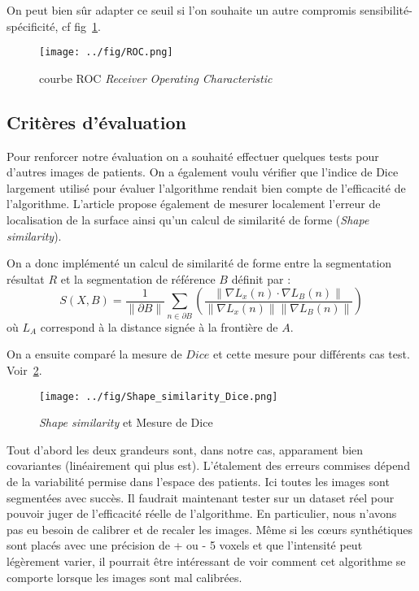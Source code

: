 \documentclass{article}
\begin{document}
On peut bien sûr adapter ce seuil si l'on souhaite un autre compromis sensibilité-spécificité, cf fig~\ref{fig:ROC}.

\begin{figure}[h!]
  \begin{center}
    \caption{courbe ROC \textit{Receiver Operating Characteristic}}
    \texttt{[image: ../fig/ROC.png]}
    \label{fig:ROC}
  \end{center}
\end{figure}

\subsection{Critères d'évaluation}

Pour renforcer notre évaluation on a souhaité effectuer quelques tests pour d'autres images de patients. On a également voulu vérifier que l'indice de Dice largement utilisé pour évaluer l'algorithme rendait bien compte de l'efficacité de l'algorithme. L'article propose également de mesurer localement l'erreur de localisation de la surface ainsi qu'un calcul de similarité de forme (\textit{Shape similarity}). 


On a donc implémenté un calcul de similarité de forme entre la segmentation résultat $R$ et la segmentation de référence $B$ définit par :
$$ S(X,B)= \frac{1}{\|\partial B \|} \sum_{n \in \partial B}{ \left( \frac{\|\nabla L_x(n) \cdot \nabla L_B(n) \|}{\|\nabla L_x(n)\| \| \nabla L_B(n) \|} \right)} $$
où $L_A$ correspond à la distance signée à la frontière de $A$.

On a ensuite comparé la mesure de $Dice$ et cette mesure pour différents cas test. Voir~\ref{fig:similarities}.


\begin{figure}[h!]
  \begin{center}
    \caption{\textit{Shape similarity} et Mesure de Dice}
      \texttt{[image: ../fig/Shape\_similarity\_Dice.png]}
      \label{fig:similarities}
  \end{center}
\end{figure}


Tout d'abord les deux grandeurs sont, dans notre cas, apparament bien covariantes (linéairement qui plus est). L'étalement des erreurs commises dépend de la variabilité permise dans l'espace des patients. Ici toutes les images sont segmentées avec succès. Il faudrait maintenant tester sur un dataset réel pour pouvoir juger de l'efficacité réelle de l'algorithme. En particulier, nous n'avons pas eu besoin de calibrer et de recaler les images. Même si les cœurs synthétiques sont placés avec une précision de + ou - 5 voxels et que l'intensité peut légèrement varier, il pourrait être intéressant de voir comment cet algorithme se comporte lorsque les images sont mal calibrées.
\end{document}
